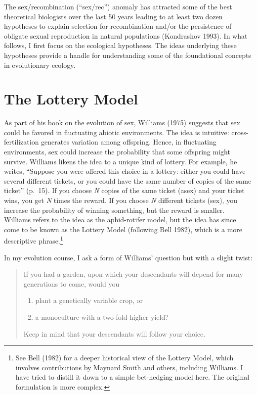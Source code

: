 \documentclass[
  letterpaper,
]{book}
\providecommand{\tightlist}{%
  \setlength{\itemsep}{0pt}\setlength{\parskip}{0pt}}\usepackage{longtable,booktabs,array}
\begin{document}
The sex/recombination (``sex/rec'') anomaly has attracted some of the
best theoretical biologists over the last 50 years leading to at least
two dozen hypotheses to explain selection for recombination and/or the
persistence of obligate sexual reproduction in natural populations
(Kondrashov 1993). In what follows, I first focus on the ecological
hypotheses. The ideas underlying these hypotheses provide a handle for
understanding some of the foundational concepts in evolutionary ecology.

\section{The Lottery Model}\label{the-lottery-model}

As part of his book on the evolution of sex, Williams (1975) suggests
that sex could be favored in fluctuating abiotic environments. The idea
is intuitive: cross-fertilization generates variation among offspring.
Hence, in fluctuating environments, sex could increase the probability
that some offspring might survive. Williams likens the idea to a unique
kind of lottery. For example, he writes, ``Suppose you were offered this
choice in a lottery: either you could have several different tickets, or
you could have the same number of copies of the same ticket'' (p.~15).
If you choose \emph{N} copies of the same ticket (asex) and your ticket
wins, you get \emph{N} times the reward. If you choose \emph{N}
different tickets (sex), you increase the probability of winning
something, but the reward is smaller. Williams refers to the idea as the
aphid-rotifer model, but the idea has since come to be known as the
Lottery Model (following Bell 1982), which is a more descriptive
phrase.\footnote{See Bell (1982) for a deeper historical view of the
  Lottery Model, which involves contributions by Maynard Smith and
  others, including Williams. I have tried to distill it down to a
  simple bet-hedging model here. The original formulation is more
  complex.}

In my evolution course, I ask a form of Williams' question but with a
slight twist:

\begin{quote}
If you had a garden, upon which your descendants will depend for many
generations to come, would you

\begin{enumerate}
\def\labelenumi{\arabic{enumi}.}
\tightlist
\item
  plant a genetically variable crop, or
\item
  a monoculture with a two-fold higher yield?
\end{enumerate}

Keep in mind that your descendants will follow your choice.
\end{quote}
\end{document}
